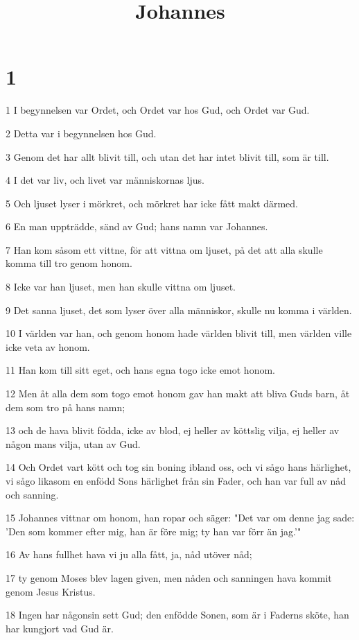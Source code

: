 

\title{Johannes}


\chapter{1}

\par 1 I begynnelsen var Ordet, och Ordet var hos Gud, och Ordet var Gud.
\par 2 Detta var i begynnelsen hos Gud.
\par 3 Genom det har allt blivit till, och utan det har intet blivit till, som är till.
\par 4 I det var liv, och livet var människornas ljus.
\par 5 Och ljuset lyser i mörkret, och mörkret har icke fått makt därmed.
\par 6 En man uppträdde, sänd av Gud; hans namn var Johannes.
\par 7 Han kom såsom ett vittne, för att vittna om ljuset, på det att alla skulle komma till tro genom honom.
\par 8 Icke var han ljuset, men han skulle vittna om ljuset.
\par 9 Det sanna ljuset, det som lyser över alla människor, skulle nu komma i världen.
\par 10 I världen var han, och genom honom hade världen blivit till, men världen ville icke veta av honom.
\par 11 Han kom till sitt eget, och hans egna togo icke emot honom.
\par 12 Men åt alla dem som togo emot honom gav han makt att bliva Guds barn, åt dem som tro på hans namn;
\par 13 och de hava blivit födda, icke av blod, ej heller av köttslig vilja, ej heller av någon mans vilja, utan av Gud.
\par 14 Och Ordet vart kött och tog sin boning ibland oss, och vi sågo hans härlighet, vi sågo likasom en enfödd Sons härlighet från sin Fader, och han var full av nåd och sanning.
\par 15 Johannes vittnar om honom, han ropar och säger: "Det var om denne jag sade: 'Den som kommer efter mig, han är före mig; ty han var förr än jag.'"
\par 16 Av hans fullhet hava vi ju alla fått, ja, nåd utöver nåd;
\par 17 ty genom Moses blev lagen given, men nåden och sanningen hava kommit genom Jesus Kristus.
\par 18 Ingen har någonsin sett Gud; den enfödde Sonen, som är i Faderns sköte, han har kungjort vad Gud är.
